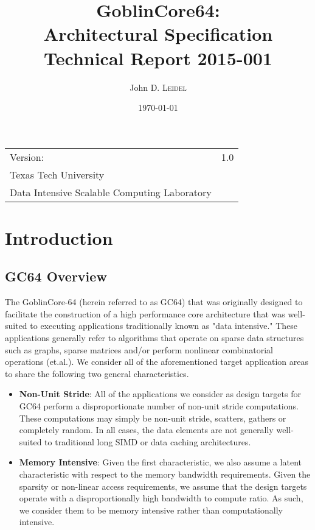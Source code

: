 \documentclass{article}
\title{GoblinCore64: \\ Architectural Specification \\ Technical Report 2015-001} %
\author{John D. \textsc{Leidel}} %
\date{\today} %
\begin{document}
\maketitle %

\begin{center}
\begin{tabular}{l r}
Version: & 1.0 \\ %
Texas Tech University \\ %
Data Intensive Scalable Computing Laboratory \\ %

\end{tabular}
\end{center}

\newpage

\tableofcontents

\newpage

\section{Introduction}

\subsection{GC64 Overview}

The GoblinCore-64 (herein referred to as GC64) that was originally designed to 
facilitate the construction of a high performance core architecture that was
well-suited to executing applications traditionally known as "data intensive."  
These applications generally refer to algorithms that operate on sparse
data structures such as graphs, sparse matrices and/or perform nonlinear 
combinatorial operations (et.al.).  We consider all of the aforementioned target
application areas to share the following two general characteristics.  

\begin{itemize}
\item \textbf{Non-Unit Stride}: All of the applications we consider as design targets
for GC64 perform a disproportionate number of non-unit stride computations.  These 
  computations may simply be non-unit stride, scatters, gathers or completely random. 
  In all cases, the data elements are not generally well-suited to traditional 
  long SIMD or data caching architectures.
\item  \textbf{Memory Intensive}: Given the first characteristic, we also assume
  a latent characteristic with respect to the memory bandwidth requirements.  
  Given the sparsity or non-linear access requirements, we assume that the design 
  targets operate with a disproportionally high bandwidth to compute ratio.  As
  such, we consider them to be memory intensive rather than computationally
  intensive.  
\end{itemize} 
\end{document}
